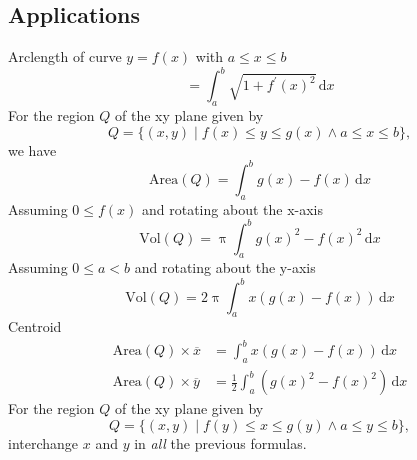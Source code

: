 \documentclass[letterpaper,9pt,fleqn]{extarticle}
\begin{document}
\begin{multicols*}{2}
\section*{Applications}
Arclength of curve \(y = f(x)\) with \(a \leq x \leq b\)
\[
   = \int_a^b \sqrt{1 + f^\prime(x)^2} \, \mathrm{d} x
\]
For the region \(Q\) of the xy plane given by
\[
   Q = \{(x,y) \mid f(x) \leq y \leq g(x) \land a \leq x \leq b \},
\]
we have
\[
  \mbox{Area}(Q) = \int_a^b g(x) - f(x) \, \mathrm{d} x
\]  
Assuming \(0 \leq f(x)\) and rotating about the \mbox{x-axis}
\[
  \mbox{Vol}(Q) = \uppi \int_a^b g(x)^2 - f(x)^2 \, \mathrm{d} x
\]
Assuming \(0 \leq a < b\) and rotating about the y-axis
\[
  \mbox{Vol}(Q) = 2 \uppi \int_a^b x (g(x)  - f(x)) \, \mathrm{d} x
\]
Centroid
\begin{align*}
    \mbox{Area}(Q) \times \overline{x} &=  \int_a^b x \left(g(x) - f(x) \right) \, \mathrm{d} x \\
     \mbox{Area}(Q) \times \overline{y} &=  \frac{1}{2} \int_a^b  \left (g(x)^2  - f(x)^2 \right) \, \mathrm{d} x
\end{align*}
For the region \(Q\) of the xy plane given by
\[
   Q = \{(x,y) \mid f(y) \leq x \leq g(y) \land a \leq y \leq b \},
\]
interchange \(x\) and \(y\) in \emph{all} the previous formulas. 
\begin{comment}
Specifically
we have
\[
  \mbox{Area}(Q) = \int_a^b g(y) - f(y) \, \mathrm{d} y
\]  
Assuming \(0 \leq f(y)\) and rotating about the \mbox{y-axis}
\[
  \mbox{Vol}(Q) = \uppi \int_a^b g(y)^2 - f(y)^2 \, \mathrm{d} y
\]
Assuming \(a \geq 0\) and rotating about the x-axis
\[
  \mbox{Vol}(Q) = 2 \uppi \int_a^b y (g(y)  - f(y)) \, \mathrm{d} y
\]
Centroid
\begin{align*}
    \mbox{Area}(Q) \times \overline{y} &=  \int_a^b y \left(g(y) - f(y) \right) \, \mathrm{d} y \\
     \mbox{Area}(Q) \times \overline{x} &=  \frac{1}{2} \int_a^b  \left (g(y)^2  - f(y)^2 \right) \, \mathrm{d} y
\end{align*}
\end{comment}
\vfill 



\end{multicols*}
\end{document}
